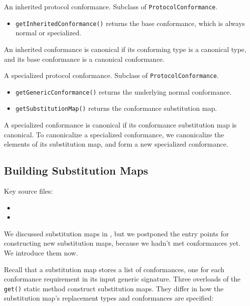 \documentclass[../generics]{subfiles}
\begin{document}
An inherited protocol conformance. Subclass of \texttt{ProtocolConformance}.
\begin{itemize}
\item \texttt{getInheritedConformance()} returns the base conformance, which is always normal or specialized.
\end{itemize}
An inherited conformance is canonical if its conforming type is a canonical type, and its base conformance is a canonical conformance.

A specialized protocol conformance. Subclass of \texttt{ProtocolConformance}.
\begin{itemize}
\item \texttt{getGenericConformance()} returns the underlying normal conformance.
\item \texttt{getSubstitutionMap()} returns the conformance substitution map.
\end{itemize}
A specialized conformance is canonical if its conformance substitution map is canonical. To canonicalize a specialized conformance, we canonicalize the elements of its substitution map, and form a new specialized conformance.

\subsection*{Building Substitution Maps}

Key source files:
\begin{itemize}
\item {}
\item {}
\end{itemize}

We discussed substitution maps in , but we postponed the entry points for constructing new substitution maps, because we hadn't met conformances yet. We introduce them now.

Recall that a substitution map stores a list of conformances, one for each conformance requirement in its input generic signature. Three overloads of the \texttt{get()} static method construct substitution maps. They differ in how the substitution map's replacement types and conformances are specified:
\end{document}
